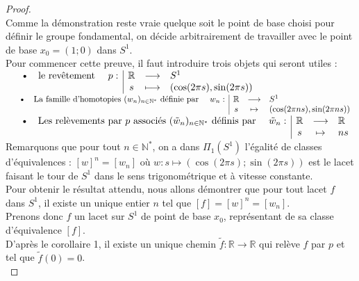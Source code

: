 		\begin{proof}~\\
			Comme la démonstration reste vraie quelque soit le point de base choisi pour définir le groupe fondamental, 
			on décide arbitrairement de travailler avec le point de base $x_{0}=(1;0)$ dans $S^{1}$.\\
			Pour commencer cette preuve, il faut introduire trois objets qui seront utiles : \bigskip\\
			$\begin{array}{l|ccl}
				\text{\quad \textbullet \quad le revêtement \quad}p:	&	\mathbb{R}	&	\longrightarrow	&	
				S^{1}	\\
																		&	s			&	\longmapsto		&	
				(\cos(2\pi s),\sin(2\pi s))
			\end{array}$\bigskip\\
			$\begin{array}{l|ccl}
				\text{\quad \textbullet \quad La famille d'homotopies $(w_{n})_{n\in\mathbb{N}^{*}}$ définie par \quad}w_{n} :	&	
				\mathbb{R}	&	\longrightarrow	&	S^{1}	\\
																																&	
				s			&	\mapsto			&	(\cos(2\pi ns),\sin(2\pi ns))
			\end{array}$\bigskip\\
			$\begin{array}{l|ccl}
				\text{\quad \textbullet \quad Les relèvements par $p$ associés $(\tilde{w}_{n})_{n\in\mathbb{N}^{*}}$ 
				définis par \quad}\tilde{w}_{n} :	&	\mathbb{R}	&	\longrightarrow	&	\mathbb{R}	\\
													&	s			&	\mapsto			&	ns
			\end{array}$\bigskip\\
			Remarquons que pour tout $n\in\mathbb{N}^{*}$, on a dans $\Pi_{1}(S^{1})$ l'égalité de classes d'équivalences : 
			$[w]^{n}=[w_{n}]$ où $w : s \mapsto (\cos(2\pi s);\sin(2\pi s))$ est le lacet faisant le tour de $S^{1}$ 
			dans le sens trigonométrique et à vitesse constante.\\ 
			Pour obtenir le résultat attendu, nous allons démontrer que pour tout lacet $f$ dans $S^{1}$, 
			il existe un unique entier $n$ tel que $[f]=[w]^{n}=[w_{n}]$.\\
			Prenons donc $f$ un lacet sur $S^{1}$ de point de base $x_{0}$, représentant de sa classe d'équivalence $[f]$.\\
			D'après le corollaire 1, il existe un unique chemin $\tilde{f}:\mathbb{R}\longrightarrow\mathbb{R}$ qui relève $f$ par 
			$p$ et tel que $\tilde{f}(0)=0$.\\

\end{proof}
